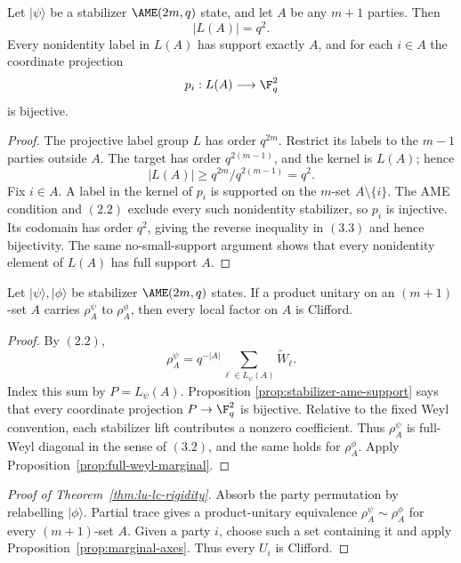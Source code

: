 \begin{proposition}
\label{prop:stabilizer-ame-support}
Let \(\lvert\psi\rangle\) be a stabilizer
\(\AME(2m,q)\) state, and let \(A\) be any \(m+1\) parties.  Then
\[
 |L(A)|=q^2.
\]
Every nonidentity label in \(L(A)\) has support exactly \(A\), and for
each \(i\in A\) the coordinate projection
\[
 p_i:L(A)\longrightarrow\F_q^2
\]
is bijective.
\end{proposition}

\begin{proof}
The projective label group \(L\) has order \(q^{2m}\).  Restrict its
labels to the \(m-1\) parties outside \(A\).  The target has order
\(q^{2(m-1)}\), and the kernel is \(L(A)\); hence
\[
 |L(A)|\geq q^{2m}/q^{2(m-1)}=q^2.                    \tag{3.3}
\]
Fix \(i\in A\).  A label in the kernel of \(p_i\) is supported on the
\(m\)-set \(A\setminus\{i\}\).  The AME condition and \((2.2)\) exclude
every such nonidentity stabilizer, so \(p_i\) is injective.  Its codomain
has order \(q^2\), giving the reverse inequality in \((3.3)\) and hence
bijectivity.  The same no-small-support argument shows that every
nonidentity element of \(L(A)\) has full support \(A\).
\end{proof}

\begin{proposition}
\label{prop:marginal-axes}
Let \(\lvert\psi\rangle,\lvert\phi\rangle\) be stabilizer
\(\AME(2m,q)\) states.  If a product unitary on an \((m+1)\)-set \(A\)
carries \(\rho^\psi_A\) to \(\rho^\phi_A\), then every local factor on
\(A\) is Clifford.
\end{proposition}

\begin{proof}
By \((2.2)\),
\[
 \rho^\psi_A=q^{-|A|}
   \sum_{\ell\in L_\psi(A)}\widetilde W_\ell .
\]
Index this sum by \(P=L_\psi(A)\).  Proposition
\ref{prop:stabilizer-ame-support} says that every coordinate projection
\(P\to\F_q^2\) is bijective.  Relative to the fixed Weyl convention, each
stabilizer lift contributes a nonzero coefficient.  Thus
\(\rho^\psi_A\) is full-Weyl diagonal in the sense of \((3.2)\), and the
same holds for \(\rho^\phi_A\).  Apply
Proposition~\ref{prop:full-weyl-marginal}.
\end{proof}

\begin{proof}[Proof of Theorem~\ref{thm:lu-lc-rigidity}]
Absorb the party permutation by relabelling \(\lvert\phi\rangle\).  Partial
trace gives a product-unitary equivalence
\(\rho^\psi_A\sim\rho^\phi_A\) for every \((m+1)\)-set \(A\).  Given a
party \(i\), choose such a set containing it and apply
Proposition~\ref{prop:marginal-axes}.  Thus every \(U_i\) is Clifford.
\end{proof}

